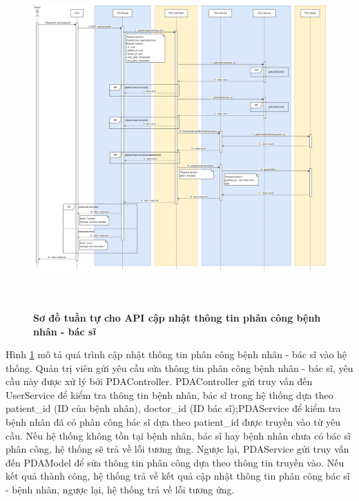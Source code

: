 \begin{figure}[H]
  \centering
  \includegraphics[width=16cm,height=13cm]{Images/sequence_api/editAssignment.png}
  \caption[Sơ đồ tuần tự cho API cập nhật thông tin phân công bệnh nhân - bác sĩ]{\bfseries \fontsize{12pt}{0pt}
  \selectfont Sơ đồ tuần tự cho API cập nhật thông tin phân công bệnh nhân - bác sĩ }
  \label{api_editPDA} %
\end{figure}
Hình \ref{api_editPDA} mô tả quá trình cập nhật thông tin phân công bệnh nhân - bác sĩ vào hệ thống. Quản trị viên gửi yêu cầu sửa thông tin phân công bệnh nhân - bác sĩ, 
yêu cầu này được xử lý bởi PDAController. PDAController gửi truy vấn đến UserService để kiểm tra thông tin bệnh nhân, bác sĩ trong hệ thống dựa theo patient\_id (ID của bệnh nhân), doctor\_id (ID bác sĩ);PDAService để kiểm
tra bệnh nhân đã có phân công bác sĩ dựa theo patient\_id được truyền vào từ yêu cầu. Nếu hệ thống không tồn tại bệnh nhân, bác sĩ hay bệnh nhân chưa có bác sĩ phân công, hệ thống sẽ trả về lỗi tương ứng. 
Ngược lại, PDAService gửi truy vấn đến PDAModel để sửa thông tin phân công dựa theo thông tin truyền vào. Nếu kết quả thành công, hệ thống trả về kết quả cập nhật thông tin phân công bác sĩ - bệnh nhân, ngược lại, hệ thống trả về lỗi tương ứng.

